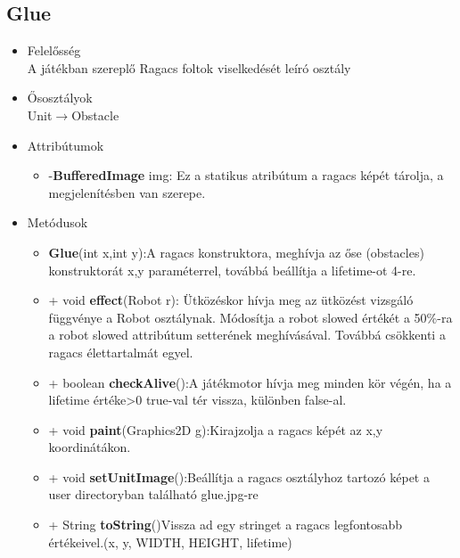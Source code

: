 \subsection{Glue}
\begin{itemize}
\item Felelősség\\
A játékban szereplő Ragacs foltok viselkedését leíró osztály
\item Ősosztályok\\
Unit$\rightarrow$Obstacle
\item Attribútumok
	\begin{itemize}
		\item -\textbf{BufferedImage} img: Ez a  statikus atribútum a ragacs képét tárolja,  a megjelenítésben van szerepe.
	\end{itemize}
\item Metódusok
	\begin{itemize}
		\item  \textbf{Glue}(int x,int y):A ragacs konstruktora, meghívja az őse (obstacles)                           konstruktorát x,y paraméterrel, továbbá beállítja a lifetime-ot 4-re.
		
		\item+ void \textbf{effect}(Robot r): Ütközéskor hívja meg az ütközést vizsgáló függvénye     a Robot osztálynak. Módosítja a robot slowed értékét a 50\%-ra a robot slowed attribútum         setterének meghívásával. Továbbá csökkenti a ragacs élettartalmát egyel.
	
		\item+ boolean \textbf{checkAlive}():A játékmotor hívja meg minden kör végén, ha a lifetime értéke>0 true-val tér vissza, különben false-al.
			\item+ void \textbf{paint}(Graphics2D g):Kirajzolja a ragacs képét az x,y koordinátákon.
				\item+ void \textbf{setUnitImage}():Beállítja a ragacs osztályhoz tartozó képet a user directoryban található glue.jpg-re
			\item+ String \textbf{toString}()Vissza ad egy stringet a  ragacs legfontosabb értékeivel.(x, y, WIDTH, HEIGHT, lifetime)
		
	\end{itemize}
\end{itemize}

